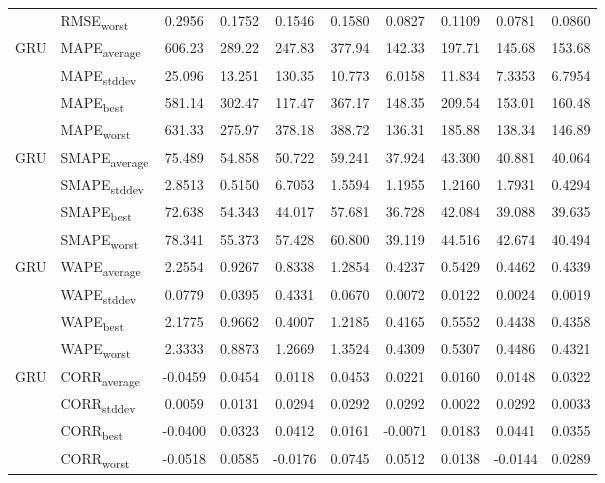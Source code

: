 {\begin{longtable}{l l c c c c c c c c}
 & RMSE\textsubscript{worst} & 0.2956 & 0.1752 & 0.1546 & 0.1580 & 0.0827 & 0.1109 & 0.0781 & 0.0860 \\
\cmidrule(lr){2-10}
\multirow{4}{*}{GRU} & MAPE\textsubscript{average} & 606.23 & 289.22 & 247.83 & 377.94 & 142.33 & 197.71 & 145.68 & 153.68 \\
 & MAPE\textsubscript{stddev} & 25.096 & 13.251 & 130.35 & 10.773 & 6.0158 & 11.834 & 7.3353 & 6.7954 \\
 & MAPE\textsubscript{best} & 581.14 & 302.47 & 117.47 & 367.17 & 148.35 & 209.54 & 153.01 & 160.48 \\
 & MAPE\textsubscript{worst} & 631.33 & 275.97 & 378.18 & 388.72 & 136.31 & 185.88 & 138.34 & 146.89 \\
\cmidrule(lr){2-10}
\multirow{4}{*}{GRU} & SMAPE\textsubscript{average} & 75.489 & 54.858 & 50.722 & 59.241 & 37.924 & 43.300 & 40.881 & 40.064 \\
 & SMAPE\textsubscript{stddev} & 2.8513 & 0.5150 & 6.7053 & 1.5594 & 1.1955 & 1.2160 & 1.7931 & 0.4294 \\
 & SMAPE\textsubscript{best} & 72.638 & 54.343 & 44.017 & 57.681 & 36.728 & 42.084 & 39.088 & 39.635 \\
 & SMAPE\textsubscript{worst} & 78.341 & 55.373 & 57.428 & 60.800 & 39.119 & 44.516 & 42.674 & 40.494 \\
\cmidrule(lr){2-10}
\multirow{4}{*}{GRU} & WAPE\textsubscript{average} & 2.2554 & 0.9267 & 0.8338 & 1.2854 & 0.4237 & 0.5429 & 0.4462 & 0.4339 \\
 & WAPE\textsubscript{stddev} & 0.0779 & 0.0395 & 0.4331 & 0.0670 & 0.0072 & 0.0122 & 0.0024 & 0.0019 \\
 & WAPE\textsubscript{best} & 2.1775 & 0.9662 & 0.4007 & 1.2185 & 0.4165 & 0.5552 & 0.4438 & 0.4358 \\
 & WAPE\textsubscript{worst} & 2.3333 & 0.8873 & 1.2669 & 1.3524 & 0.4309 & 0.5307 & 0.4486 & 0.4321 \\
\cmidrule(lr){2-10}
\multirow{4}{*}{GRU} & CORR\textsubscript{average} & -0.0459 & 0.0454 & 0.0118 & 0.0453 & 0.0221 & 0.0160 & 0.0148 & 0.0322 \\
 & CORR\textsubscript{stddev} & 0.0059 & 0.0131 & 0.0294 & 0.0292 & 0.0292 & 0.0022 & 0.0292 & 0.0033 \\
 & CORR\textsubscript{best} & -0.0400 & 0.0323 & 0.0412 & 0.0161 & -0.0071 & 0.0183 & 0.0441 & 0.0355 \\
 & CORR\textsubscript{worst} & -0.0518 & 0.0585 & -0.0176 & 0.0745 & 0.0512 & 0.0138 & -0.0144 & 0.0289 \\

\end{longtable}}
